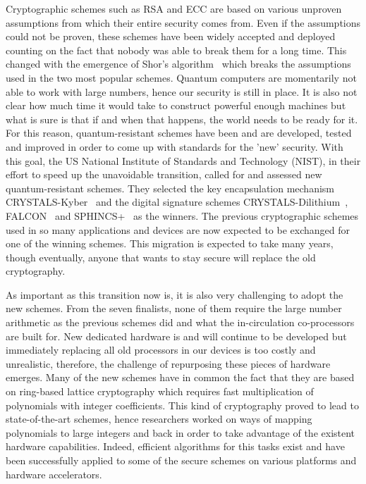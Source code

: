 Cryptographic schemes such as RSA and ECC are based on various unproven assumptions from which their entire security comes from. Even if the assumptions could not be proven, these schemes have been widely accepted and deployed counting on the fact that nobody was able to break them for a long time. This changed with the emergence of Shor's algorithm~\parencite{365700} which breaks the assumptions used in the two most popular schemes. Quantum computers are momentarily not able to work with large numbers, hence our security is still in place. It is also not clear how much time it would take to construct powerful enough machines but what is sure is that if and when that happens, the world needs to be ready for it. For this reason, quantum-resistant schemes have been and are developed, tested and improved in order to come up with standards for the 'new' security. With this goal, the US National Institute of Standards and Technology (NIST), in their effort to speed up the unavoidable transition, called for and assessed new quantum-resistant schemes. They selected the key encapsulation mechanism  CRYSTALS-Kyber~\parencite{cryptoeprint:2017/634} and the digital signature schemes CRYSTALS-Dilithium~\parencite{cryptoeprint:2017/633}, FALCON~\parencite{Soni2021} and SPHINCS+~\parencite{10.1007/978-3-662-46800-5_15} as the winners. The previous cryptographic schemes used in so many applications and devices are now expected to be exchanged for one of the winning schemes. This migration is expected to take many years, though eventually, anyone that wants to stay secure will replace the old cryptography.

As important as this transition now is, it is also very challenging to adopt the new schemes. From the seven finalists, none of them require the large number arithmetic as the previous schemes did and what the in-circulation co-processors are built for. New dedicated hardware is and will continue to be developed but immediately replacing all old processors in our devices is too costly and unrealistic, therefore, the challenge of repurposing these pieces of hardware emerges. Many of the new schemes have in common the fact that they are based on ring-based lattice cryptography which requires fast multiplication of polynomials with integer coefficients. This kind of cryptography proved to lead to state-of-the-art schemes, hence researchers worked on ways of mapping polynomials to large integers and back in order to take advantage of the existent hardware capabilities. Indeed, efficient algorithms for this tasks exist and have been successfully applied to some of the secure schemes on various platforms and hardware accelerators. 

